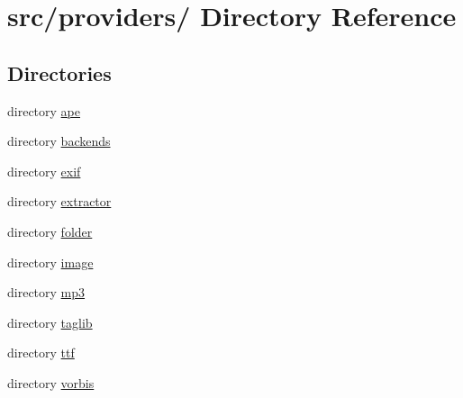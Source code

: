 \hypertarget{dir_000006}{
\section{src/providers/ Directory Reference}
\label{dir_000006}
}
\subsection*{Directories}
\begin{CompactItemize}
\item 
directory \hyperlink{dir_000007}{ape}
\item 
directory \hyperlink{dir_000023}{backends}
\item 
directory \hyperlink{dir_000021}{exif}
\item 
directory \hyperlink{dir_000022}{extractor}
\item 
directory \hyperlink{dir_000024}{folder}
\item 
directory \hyperlink{dir_000028}{image}
\item 
directory \hyperlink{dir_000025}{mp3}
\item 
directory \hyperlink{dir_000043}{taglib}
\item 
directory \hyperlink{dir_000047}{ttf}
\item 
directory \hyperlink{dir_000049}{vorbis}
\end{CompactItemize}
